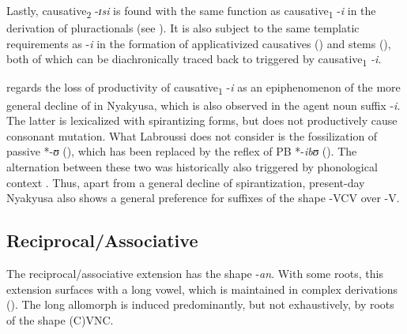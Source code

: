 Lastly, causative\textsubscript{2} -\textit{ɪsi} is found with the same function as causative\textsubscript{1} -\textit{i} in the derivation of pluractionals (see ). It is also subject to the same templatic requirements as -\textit{i} in the formation of applicativized causatives () and stems (), both of which can be diachronically traced back to  triggered by causative\textsubscript{1} \textit{-i}.

\citet{LabroussiC1999} regards the loss of productivity of causative\textsubscript{1} -\textit{i} as an epiphenomenon of the more general decline of  in Nyakyusa, which is also observed in the agent noun suffix -\textit{i}. The latter is lexicalized with spirantizing forms, but does not productively cause consonant mutation. What Labroussi does not consider is the fossilization of passive *-\textit{ʊ} (), which has been replaced by the reflex of PB *-\textit{ibʊ} (). The alternation between these two was historically also triggered by phonological context \citep[78]{SchadebergT2003a}. Thus, apart from a general decline of spirantization, present-day Nyakyusa also shows a general preference for suffixes of the shape -VCV over -V.
\subsection{Reciprocal/Associative}
\label{Reciprocal}
The reciprocal/associative extension has the shape -\textit{an}. With some roots, this extension surfaces with a long vowel, which is maintained in complex derivations (). The long allomorph is induced predominantly, but not exhaustively, by roots of the shape (C)VNC.

